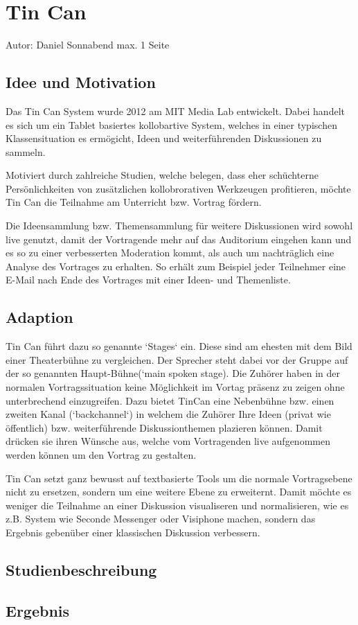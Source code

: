 \section{Tin Can}
Autor: Daniel Sonnabend
max. 1 Seite
\subsection{Idee und Motivation}
Das Tin Can System\cite{HarGorSch2012} wurde 2012 am MIT Media Lab entwickelt.
Dabei handelt es sich um ein Tablet basiertes kollobartive System, welches in
einer typischen Klassensituation es ermögicht, Ideen und weiterführenden
Diskussionen zu sammeln.

Motiviert durch zahlreiche Studien, welche belegen, dass eher schüchterne
Persönlichkeiten von zusätzlichen kollobrorativen Werkzeugen profitieren, möchte
Tin Can die Teilnahme am Unterricht bzw. Vortrag fördern.

Die Ideensammlung bzw. Themensammlung für weitere Diskussionen wird sowohl live
genutzt, damit der Vortragende mehr auf das Auditorium eingehen kann und es so
zu einer verbesserten Moderation kommt, als auch um nach\-träglich eine Analyse
des Vortrages zu erhalten. So erhält zum Beispiel jeder Teilnehmer eine E-Mail
nach Ende des Vortrages mit einer Ideen- und Themenliste.

\subsection{Adaption}
Tin Can führt dazu so genannte `Stages` ein. Diese sind am ehesten mit dem Bild
einer Theaterbühne zu vergleichen. Der Sprecher steht dabei vor der Gruppe auf
der so genannten Haupt-Bühne(`main spoken stage). Die Zuhörer haben in der
normalen Vortragssituation keine Möglichkeit im Vortag präsenz zu zeigen ohne
unterbrechend einzugreifen. Dazu bietet TinCan eine Nebenbühne bzw. einen
zweiten Kanal (`backchannel`) in welchem die Zuhörer Ihre Ideen (privat wie
öffentlich) bzw. wei\-ter\-führ\-en\-de Dis\-kus\-sion\-themen plazieren können.
Damit drücken sie ihren Wünsche aus, welche vom Vortragenden live aufgenommen
werden können um den Vortrag zu gestalten.

Tin Can setzt ganz bewusst auf textbasierte Tools um die normale Vortragsebene
nicht zu ersetzen, sondern um eine weitere Ebene zu erweiternt. Damit möchte es
weniger die Teilnahme an einer Diskussion visualiseren und normalisieren, wie es
z.B. System wie Seconde Messenger oder Visiphone machen, sondern das Ergebnis
gebenüber einer klassischen Diskussion verbessern.

\subsection{Studienbeschreibung}


\subsection{Ergebnis}

